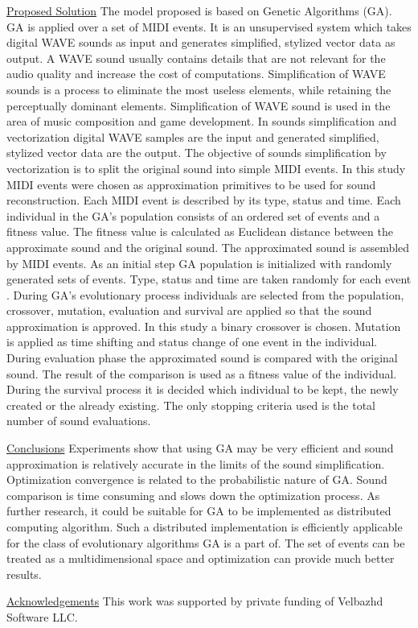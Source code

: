 \documentclass{article}
\begin{document}
\underline{Proposed Solution} The model proposed is based on Genetic Algorithms (GA). GA is applied over a set of MIDI events. It is an unsupervised system which takes digital WAVE sounds as input and generates simplified, stylized vector data as output. A WAVE sound usually contains details that are not relevant for the audio quality and increase the cost of computations. Simplification of WAVE sounds is a process to eliminate the most useless elements, while retaining the perceptually dominant elements. Simplification of WAVE sound is used in the area of music composition and game development. In sounds simplification and vectorization digital WAVE samples are the input and generated simplified, stylized vector data are the output. The objective of sounds simplification by vectorization is to split the original sound into simple MIDI events. In this study MIDI events were chosen as approximation primitives to be used for sound reconstruction. Each MIDI event is described by its type, status and time. Each individual in the GA's population consists of an ordered set of events and a fitness value. The fitness value is calculated as Euclidean distance between the approximate sound and the original sound. The approximated sound is assembled by MIDI events. As an initial step GA population is initialized with randomly generated sets of events. Type, status and time are taken randomly for each event . During GA's evolutionary process individuals are selected from the population, crossover, mutation, evaluation and survival are applied so that the sound approximation is approved. In this study a binary crossover is chosen. Mutation is applied as time shifting and status change of one event in the individual. During evaluation phase the approximated sound is compared with the original sound. The result of the comparison is used as a fitness value of the individual. During the survival process it is decided which individual to be kept, the newly created or the already existing. The only stopping criteria used is the total number of sound evaluations.
\vspace*{3mm}

\underline{Conclusions} Experiments show that using GA may be very efficient and sound approximation is relatively accurate in the limits of the sound simplification. Optimization convergence is related to the probabilistic nature of GA. Sound comparison is time consuming and slows down the optimization process. As further research, it could be suitable for GA to be implemented as distributed computing algorithm. Such a distributed implementation is efficiently applicable for the class of evolutionary algorithms GA is a part of. The set of events can be treated as a multidimensional space and optimization can provide much better results.
\vspace*{5mm}

\underline{Acknowledgements} This work was supported by private funding of Velbazhd Software LLC.
%
\end{document}
